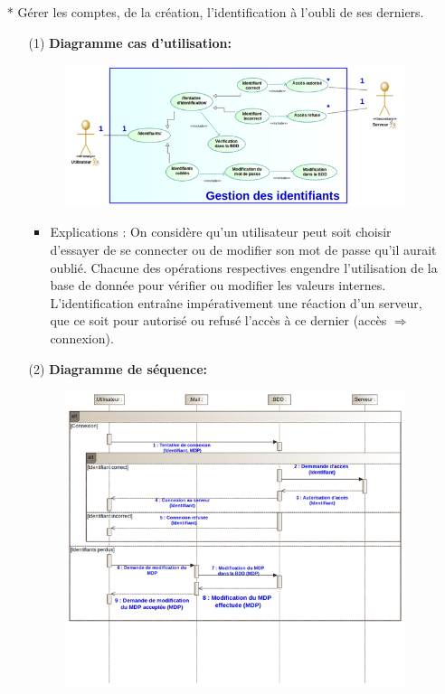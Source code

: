 \documentclass[12pt]{article}
\begin{document}
\newpage
\begin{itemize}
	\item[* ] Gérer les comptes, de la création, l’identification à l’oubli de ses derniers.
		\begin{itemize}
		\item[(1)] \textbf{Diagramme cas d'utilisation:}
	\begin{figure}[!hbtp]
		\centering
		\includegraphics[scale=0.75]{image2.png}
	\end{figure}
	\begin{itemize}
		\item Explications : On considère qu’un utilisateur peut soit choisir d’essayer de se connecter ou de modifier son mot de passe qu’il aurait oublié.
		Chacune des opérations respectives engendre l’utilisation de la base de donnée pour vérifier ou modifier les valeurs internes.
		L’identification entraîne impérativement une réaction d’un serveur, que ce soit pour autorisé ou refusé l’accès à ce dernier (accès $\Rightarrow$ connexion).
		
	\end{itemize}
\item[(2)] \textbf{Diagramme de séquence:}
\begin{figure}[!hbtp]
	\centering
	\includegraphics[scale=0.75]{image3.png}
\end{figure}
\end{itemize}
\end{itemize}
\end{document}
